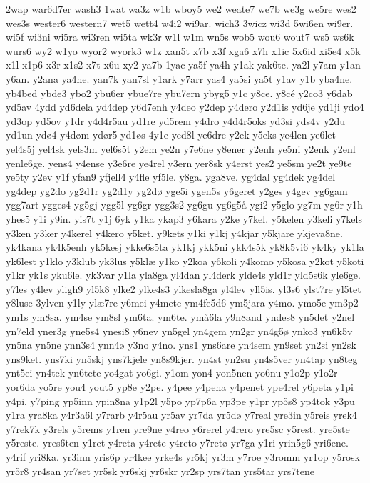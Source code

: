 {2wap
war6d7er
wash3
1wat
wa3z
w1b
wboy5
we2
weate7
we7b
we3g
we5re
wes2
wes3s
wester6
western7
wet5
wett4
w4i2
wi9ar.
wich3
3wicz
wi3d
5wi6en
wi9er.
wi5f
wi3ni
wi5ra
wi3ren
wi5ta
wk3r
w1l
w1m
wn5s
wob5
wou6
wout7
ws5
ws6k
wurs6
wy2
w1yo
wyor2
wyork3
w1z
xan5t
x7b
x3f
xga6
x7h
x1ic
5x6id
xi5e4
x5k
x1l
x1p6
x3r
x1s2
x7t
x6u
xy2
ya7b
1yac
ya5f
ya4h
y1ak
yak6te.
ya2l
y7am
y1an
y6an.
y2ana
ya4ne.
yan7k
yan7sl
y1ark
y7arr
yas4
ya5si
ya5t
y1av
y1b
yba4ne.
yb4bed
ybde3
ybo2
ybu6er
ybue7re
ybu7ern
ybyg5
y1c
y8ce.
y8cé
y2co3
y6dab
yd5av
4ydd
yd6dela
yd4dep
y6d7enh
y4deo
y2dep
y4dero
y2d1is
yd6je
yd1ji
ydo4
yd3op
yd5ov
y1dr
y4d4r5au
yd1re
yd5rem
y4dro
y4d4r5oks
yd3si
yds4v
y2du
yd1un
ydø4
y4døm
ydør5
yd1øs
4y1e
yed8l
ye6dre
y2ek
y5eks
ye4len
ye6let
yel4s5j
yel4sk
yels3m
yel6s5t
y2em
ye2n
y7e6ne
y8ener
y2enh
ye5ni
y2enk
y2enl
yenle6ge.
yens4
y4ense
y3e6re
ye4rel
y3ern
yer8sk
y4erst
yes2
ye5sm
ye2t
ye9te
ye5ty
y2ev
y1f
yfan9
yfjell4
y4fle
yf5le.
y8ga.
yga8ve.
yg4dal
yg4dek
yg4del
yg4dep
yg2do
yg2d1r
yg2d1y
yg2dø
yge5i
ygen5s
y6geret
y2ges
y4gev
yg6gam
ygg7art
ygges4
yg5gj
ygg5l
yg6gr
ygg3s2
yg6gu
yg6g5å
ygi2
y5glo
yg7m
yg6r
y1h
yhes5
y1i
y9in.
yis7t
y1j
6yk
y1ka
ykap3
y6kara
y2ke
y7kel.
y5kelen
y3keli
y7kels
y3ken
y3ker
y4kerel
y4kero
y5ket.
y9kets
y1ki
y1kj
y4kjar
y5kjare
ykjeva8ne.
yk4kana
yk4k5enh
yk5kesj
ykke6s5ta
yk1kj
ykk5ni
ykk4s5k
yk8k5vi6
yk4ky
yk1la
yk6lest
y1klo
y3klub
yk3lus
y5klæ
y1ko
y2koa
y6koli
y4komo
y5kosa
y2kot
y5koti
y1kr
yk1s
yku6le.
yk3var
y1la
yla8ga
yl4dan
yl4derk
ylde4s
yld1r
yld5s6k
yle6ge.
y7les
y4lev
yligh9
yl5k8
ylke2
ylke4s3
ylkesla8ga
yl4lev
yll5is.
yl3s6
ylst7re
yl5tet
y8luse
3ylven
y1ly
ylæ7re
y6mei
y4mete
ym4fe5d6
ym5jara
y4mo.
ymo5e
ym3p2
ym1s
ym8sa.
ym4se
ym8sl
ym6ta.
ym6te.
ymå6la
y9n8and
yndes8
yn5det
y2nel
yn7eld
yner3g
yne5s4
ynesi8
y6nev
yn5gel
yn4gem
yn2gr
yn4g5ø
ynko3
yn6k5v
yn5na
yn5ne
ynn3s4
ynn4ø
y3no
y4no.
yns1
yns6are
yn4sem
yn9set
yn2si
yn2sk
yns9ket.
yns7ki
yn5skj
yns7kjele
yn8s9kjer.
yn4st
yn2su
yn4s5ver
yn4tap
yn8teg
ynt5ei
yn4tek
yn6tete
yo4gat
yo6gi.
y1om
yon4
yon5nen
yo6nu
y1o2p
y1o2r
yor6da
yo5re
you4
yout5
yp8e
y2pe.
y4pee
y4pena
y4penet
ype4rel
y6peta
y1pi
y4pi.
y7ping
yp5inn
ypin8na
y1p2l
y5po
yp7p6a
yp3pe
y1pr
yp5s8
yp4tok
y3pu
y1ra
yra8ka
y4r3a6l
y7rarb
y4r5au
yr5av
yr7da
yr5dø
y7real
yre3in
y5reis
yrek4
y7rek7k
y3rels
y5rems
y1ren
yre9ne
y4reo
y6rerel
y4rero
yre5sc
y5rest.
yre5ste
y5reste.
yres6ten
y1ret
y4reta
y4rete
y4reto
y7retø
yr7ga
y1ri
yrin5g6
yri6ene.
y4rif
yri8ka.
yr3inn
yris6p
yr4kee
yrke4s
yr5kj
yr3m
y7roe
y3romm
yr1op
y5rosk
yr5r8
yr4san
yr7set
yr5sk
yr6skj
yr6skr
yr2sp
yrs7tan
yrs5tar
yrs7tene
}
